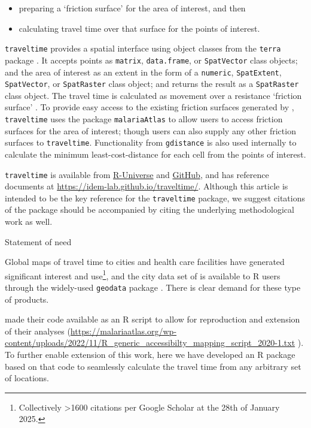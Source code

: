 \documentclass[
  12pt]{article}
\providecommand{\tightlist}{%
  \setlength{\itemsep}{0pt}\setlength{\parskip}{0pt}}\usepackage{longtable,booktabs,array}
\begin{document}
\begin{itemize}
\tightlist
\item
  preparing a `friction surface' for the area of interest, and then
\item
  calculating travel time over that surface for the points of interest.
\end{itemize}

\texttt{traveltime} provides a spatial interface using object classes
from the \texttt{terra} package \citep{terra}. It accepts points as
\texttt{matrix}, \texttt{data.frame}, or \texttt{SpatVector} class
objects; and the area of interest as an extent in the form of a
\texttt{numeric}, \texttt{SpatExtent}, \texttt{SpatVector}, or
\texttt{SpatRaster} class object; and returns the result as a
\texttt{SpatRaster} class object. The travel time is calculated as
movement over a resistance `friction surface' \citep{gdistance2017}. To
provide easy access to the existing friction surfaces generated by
\citet{weiss2020global}, \texttt{traveltime} uses the package
\texttt{malariaAtlas} to allow users to access friction surfaces for the
area of interest; though users can also supply any other friction
surfaces to \texttt{traveltime}. Functionality from \texttt{gdistance}
\citep{gdistance2017} is also used internally to calculate the minimum
least-cost-distance for each cell from the points of interest.

\texttt{traveltime} is available from
\href{https://idem-lab.r-universe.dev/traveltime}{R-Universe} and
\href{https://github.com/idem-lab/traveltime}{GitHub}, and has reference
documents at \url{https://idem-lab.github.io/traveltime/}. Although this
article is intended to be the key reference for the \texttt{traveltime}
package, we suggest citations of the package should be accompanied by
citing the underlying methodological work
\citep{weiss2018global, weiss2020global} as well.

Statement of need

Global maps of travel time to cities
\citep{weiss2018global, nelson2019suite} and health care facilities
\citep{hulland2019travel, weiss2020global} have generated significant
interest and use\footnote{Collectively \textgreater1600 citations per
  Google Scholar at the 28th of January 2025.}, and the city data set of
\citet{nelson2019suite} is available to R users through the widely-used
\texttt{geodata} package \citep{geodata}. There is clear demand for
these type of products.

\citet{weiss2020global} made their code available as an R script to
allow for reproduction and extension of their analyses
(\url{https://malariaatlas.org/wp-content/uploads/2022/11/R_generic_accessibilty_mapping_script_2020-1.txt}
). To further enable extension of this work, here we have developed an R
package based on that code to seamlessly calculate the travel time from
any arbitrary set of locations.
\end{document}
